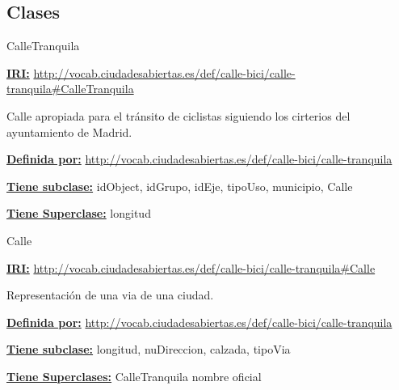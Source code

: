 \subsection{Clases}



\begin{mybox}{CalleTranquila}
\begin{flushleft}
\underline{\textbf{IRI:}}
\url{http://vocab.ciudadesabiertas.es/def/calle-bici/calle-tranquila#CalleTranquila}
\newline

Calle apropiada para el tránsito de ciclistas siguiendo los cirterios del ayuntamiento de Madrid.
\newline

\underline{\textbf{Definida por:}}
\url{http://vocab.ciudadesabiertas.es/def/calle-bici/calle-tranquila}
\newline

\underline{\textbf{Tiene subclase:}}
\newline idObject,\hspace{2em}  idGrupo,\hspace{2em} idEje,	\hspace{2em} tipoUso,
\newline municipio,\hspace{2em} Calle

\underline{\textbf{Tiene Superclase:}}
\newline longitud

\end{flushleft}
\end{mybox}







\begin{mybox}{Calle}
\begin{flushleft}
\underline{\textbf{IRI:}}
\url{http://vocab.ciudadesabiertas.es/def/calle-bici/calle-tranquila#Calle}
\newline

Representación de una via de una ciudad.
\newline

\underline{\textbf{Definida por:}}
\url{http://vocab.ciudadesabiertas.es/def/calle-bici/calle-tranquila}
\newline

\underline{\textbf{Tiene subclase:}}
\newline longitud,\hspace{2em}  nuDireccion,
\newline calzada,\hspace{2em} tipoVia

\underline{\textbf{Tiene Superclases:}}
\newline CalleTranquila
\newline nombre oficial

\end{flushleft}
\end{mybox}

